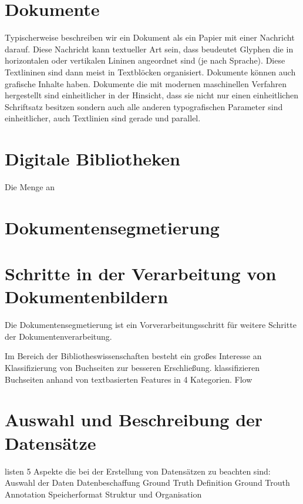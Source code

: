 \section{Dokumente}
Typischerweise beschreiben wir ein Dokument als ein Papier mit einer Nachricht darauf. Diese Nachricht kann textueller Art sein, dass beudeutet Glyphen die in horizontalen oder vertikalen Lininen angeordnet sind (je nach Sprache)\parencite{BairdBriefHistoryDocuments2014}. Diese Textlininen sind dann meist in Textblöcken organisiert. Dokumente können auch grafische Inhalte haben. 
Dokumente die mit modernen maschinellen Verfahren hergestellt sind einheitlicher in der Hinsicht, dass sie nicht nur einen einheitlichen Schriftsatz besitzen sondern auch alle anderen typografischen Parameter sind einheitlicher, auch Textlinien sind gerade und parallel.  

\section{Digitale Bibliotheken}
Die Menge an 
\cite{BairdDigitallibrariesdocument2003}

\section{Dokumentensegmetierung}



\section{Schritte in der Verarbeitung von Dokumentenbildern}
Die Dokumentensegmetierung ist ein Vorverarbeitungsschritt für weitere Schritte der Dokumentenverarbeitung.

Im Bereich der Bibliotheswissenschaften besteht ein großes Interesse an Klassifizierung von
Buchseiten zur besseren Erschließung.
\cite{McConnaugheyLabeledSegmentationPrinted2017} klassifizieren Buchseiten anhand von textbasierten Features in 4 Kategorien. 
Flow

\section{Auswahl und Beschreibung der Datensätze}
\textcite[985\psqq]{DoermannHandbookdocumentimage2014} listen 5 Aspekte die bei der Erstellung von Datensätzen zu beachten sind:
Auswahl der Daten
Datenbeschaffung
Ground Truth Definition
Ground Trouth Annotation
Speicherformat
Struktur und Organisation

